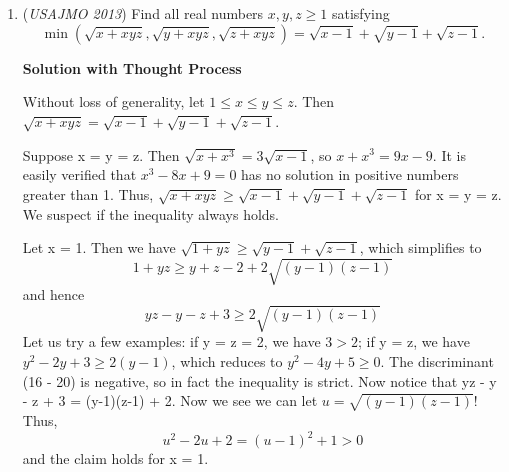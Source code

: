 \begin{enumerate}
\textbf{Solution 4}

First, since $XY$ is the diameter and $A$, $B$, and $C$ lie on the circle, 
 \[\angle {XAY} = \angle {XBY} = \angle{XCY} = 90\]. Next, because $AZ$ and $CY$ are both perpendicular to $CX$, we have $AZ$ to be parallel to $CY$. 

 Now looking at quadrilateral $APZX$, we see that this is cyclic because 
 \[\angle {PAX} + \angle {PZX} = 90+90 = 180.\] Set $\alpha = \angle{BXA} = \angle{BYA}$, and $\beta = \angle{BXC} = \angle{BYC}$. Now, 
 \[\angle{AYC} = \angle{YAZ}\] since $AZ$ and $CY$ are parallel. Also, 
 \[\angle{PAZ} = \angle{PXZ} = \alpha + \beta.\] That means 
 \[\angle{PXZ} = \angle{PXQ} + \angle{QXZ} = \beta + \angle{QXZ} = \alpha + \beta\] so 
 \[\angle{QXZ} = \alpha.\] This means $\angle{QXZ} = \angle{YBC} = \alpha$, so $BC$ and $AY$ are parallel. Finally, we can look at the equation. We know 
 \[XP\cos{\alpha} = AX,\] so $XP = \frac{AX}{\cos{\alpha}}.$We also know 
 \[XQ\cos(\alpha+\beta) = AX,\] so $XQ = \frac{AX}{\cos(\alpha+\beta)}.$Plugging this into the LHS of the equation, we get 
 \[\frac{BY\cos\alpha}{AX}+\frac{CY\cos(\alpha+\beta)}{AZ}.\]Now, let $H$ be the point on $AY$ such that $BH$ is perpendicular to $AY$. Also, since $\angle{AYB} = \angle{CXY}$, their arcs have equal length, and $AB=CY$. Now, the LHS is simplified even more to 
 \[\frac{AB\cos\alpha}{AX}+\frac{CY\cos(\alpha+\beta)}{AZ}\] which is equal to 
 \[\frac{AH+YH}{AZ}\] which is equal to 
 \[\frac{AY}{AX}.\] This completes the proof. 

 


 


	\item (\textit{USAJMO 2013}) Find all real numbers $x,y,z\geq 1$ satisfying 
 \[\min(\sqrt{x+xyz},\sqrt{y+xyz},\sqrt{z+xyz})=\sqrt{x-1}+\sqrt{y-1}+\sqrt{z-1}.\]




\textbf{Solution with Thought Process}

Without loss of generality, let $1 \le x \le y \le z$. Then $\sqrt{x + xyz} = \sqrt{x - 1} + \sqrt{y - 1} + \sqrt{z - 1}$.

 Suppose x = y = z. Then $\sqrt{x + x^3} = 3\sqrt{x-1}$, so $x + x^3 = 9x - 9$. It is easily verified that $x^3 - 8x + 9 = 0$ has no solution in positive numbers greater than 1. Thus, $\sqrt{x + xyz} \ge \sqrt{x - 1} + \sqrt{y - 1} + \sqrt{z - 1}$ for x = y = z. We suspect if the inequality always holds.

 Let x = 1. Then we have $\sqrt{1 + yz} \ge \sqrt{y-1} + \sqrt{z-1}$, which simplifies to 
 \[1 + yz \ge y + z - 2 + 2\sqrt{(y-1)(z-1)}\] and hence 
 \[yz - y - z + 3 \ge 2\sqrt{(y-1)(z-1)}\] Let us try a few examples: if y = z = 2, we have $3 > 2$; if y = z, we have $y^2 - 2y + 3 \ge 2(y-1)$, which reduces to $y^2 - 4y + 5 \ge 0$. The discriminant (16 - 20) is negative, so in fact the inequality is strict. Now notice that yz - y - z + 3 = (y-1)(z-1) + 2. Now we see we can let $u = \sqrt{(y-1)(z-1)}$! Thus, 
 \[u^2 - 2u + 2 = (u-1)^2 + 1 > 0\] and the claim holds for x = 1.


\end{enumerate}
